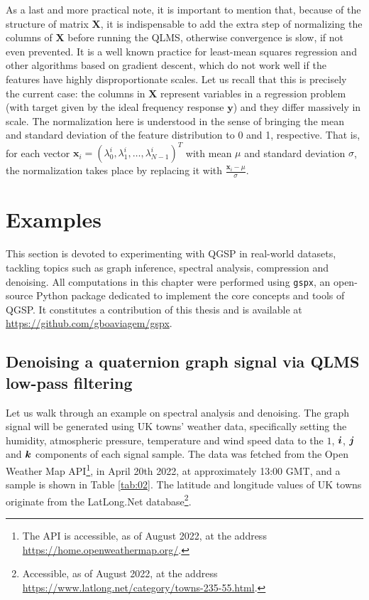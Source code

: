 As a last and more practical note, it is important to mention that, because of the structure of matrix $\mathbf{X}$, it is indispensable to add the extra step of normalizing the columns of $\mathbf{X}$ before running the QLMS, otherwise convergence is slow, if not even prevented. It is a well known practice for least-mean squares regression and other algorithms based on gradient descent, which do not work well if the features have highly disproportionate scales. Let us recall that this is precisely the current case: the columns in $\mathbf{X}$ represent variables in a regression problem (with target given by the ideal frequency response $\mathbf{y}$) and they differ massively in scale. The normalization here is understood in the sense of bringing the mean and standard deviation of the feature distribution to 0 and 1, respective. That is, for each vector $\mathbf{x}_i = (\lambda^i_0, \lambda^i_1, \dots, \lambda^i_{N-1})^T$ with mean $\mu$ and standard deviation $\sigma$, the normalization takes place by replacing it with $\frac{\mathbf{x}_i - \mu}{\sigma}$.

\section{Examples}

This section is devoted to experimenting with QGSP in real-world datasets, tackling topics such as graph inference, spectral analysis, compression and denoising. All computations in this chapter were performed using \texttt{gspx}, an open-source Python package dedicated to implement the core concepts and tools of QGSP. It constitutes a contribution of this thesis and is available at \url{https://github.com/gboaviagem/gspx}.

\subsection{Denoising a quaternion graph signal via QLMS low-pass filtering}
\label{subsec:denoising}

Let us walk through an example on spectral analysis and denoising. The graph signal will be generated using UK towns' weather data, specifically setting the humidity, atmospheric pressure, temperature and wind speed data to the $1$, $\boldsymbol{i}$, $\boldsymbol{j}$ and $\boldsymbol{k}$ components of each signal sample. The data was fetched from the Open Weather Map API\footnote{The API is accessible, as of August 2022, at the address \url{https://home.openweathermap.org/}.}, in April 20th 2022, at approximately 13:00 GMT, and a sample is shown in Table \ref{tab:02}. The latitude and longitude values of UK towns originate from the LatLong.Net database\footnote{Accessible, as of August 2022, at the address \url{https://www.latlong.net/category/towns-235-55.html}.}.

